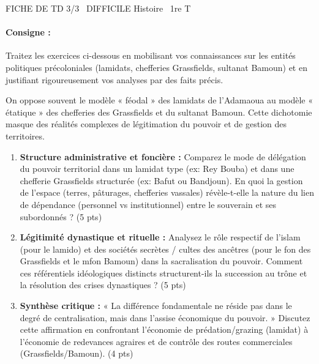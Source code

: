 \documentclass[11pt]{article}
\begin{document}
\begin{tcolorbox}[enhanced,colback=popink,colframe=popink,arc=10pt,boxrule=0pt,left=12pt,right=12pt,top=9pt,bottom=9pt]
{\color{white}\popxbold\small FICHE DE TD 3/3 \textbullet\ DIFFICILE \hfill Histoire \textbullet\ 1re T\par}
\end{tcolorbox}
\vspace{4pt}
\paragraph{Consigne :} Traitez les exercices ci-dessous en mobilisant vos connaissances sur les entités politiques précoloniales (lamidats, chefferies Grassfields, sultanat Bamoun) et en justifiant rigoureusement vos analyses par des faits précis.

\begin{exercice}
\label{exo:comparatif}
On oppose souvent le modèle « féodal » des lamidats de l'Adamaoua au modèle « étatique » des chefferies des Grassfields et du sultanat Bamoun. Cette dichotomie masque des réalités complexes de légitimation du pouvoir et de gestion des territoires.

\begin{enumerate}
    \item \textbf{Structure administrative et foncière :} Comparez le mode de délégation du pouvoir territorial dans un lamidat type (ex: Rey Bouba) et dans une chefferie Grassfields structurée (ex: Bafut ou Bandjoun). En quoi la gestion de l'espace (terres, pâturages, chefferies vassales) révèle-t-elle la nature du lien de dépendance (personnel vs institutionnel) entre le souverain et ses subordonnés ? \hfill (5 pts)
    
    \item \textbf{Légitimité dynastique et rituelle :} Analysez le rôle respectif de l'islam (pour le lamido) et des sociétés secrètes / cultes des ancêtres (pour le fon des Grassfields et le mfon Bamoun) dans la sacralisation du pouvoir. Comment ces référentiels idéologiques distincts structurent-ils la succession au trône et la résolution des crises dynastiques ? \hfill (5 pts)
    
    \item \textbf{Synthèse critique :} « La différence fondamentale ne réside pas dans le degré de centralisation, mais dans l'assise économique du pouvoir. » Discutez cette affirmation en confrontant l'économie de prédation/grazing (lamidat) à l'économie de redevances agraires et de contrôle des routes commerciales (Grassfields/Bamoun). \hfill (4 pts)
\end{enumerate}
\end{exercice}
\end{document}
